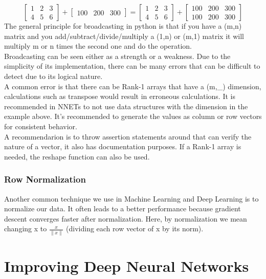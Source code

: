 \documentclass[11pt]{report}
\begin{document}
\begin{equation*}
    \begin{bmatrix}
        1 & 2 & 3\\4 & 5 & 6
    \end{bmatrix}
    +
    \begin{bmatrix}
        100 & 200 & 300
    \end{bmatrix} =
    \begin{bmatrix}
        1 & 2 & 3\\4 & 5 & 6
    \end{bmatrix}+
    \begin{bmatrix}
        100 & 200 & 300\\100 & 200 & 300
    \end{bmatrix}
\end{equation*}
The general principle for broadcasting in python is that if you have a (m,n) matrix and you add/subtract/divide/multiply a (1,n) or (m,1) matrix it will multiply m or n times the second one and do the operation.\\
Broadcasting can be seen either as a strength or a weakness. Due to the simplicity of its implementation, there can be many errors that can be difficult to detect due to its logical nature.\\
A common error is that there can be Rank-1 arrays that have a (m,\_) dimension, calculations such as transpose would result in erroneous calculations. It is recommended in NNETs to not use data structures with the dimension in the example above. It's recommended to generate the values as column or row vectors for consistent behavior.\\
A recommendarion is to throw assertion statements around that can verify the nature of a vector, it also has documentation purposes. If a Rank-1 array is needed, the reshape function can also be used.

\subsection{Row Normalization}
Another common technique we use in Machine Learning and Deep Learning is to normalize our data. It often leads to a better performance because gradient descent converges faster after normalization. Here, by normalization we mean changing x to $ \frac{x}{\| x\|} $ (dividing each row vector of x by its norm).

\chapter{Improving Deep Neural Networks}
\end{document}
